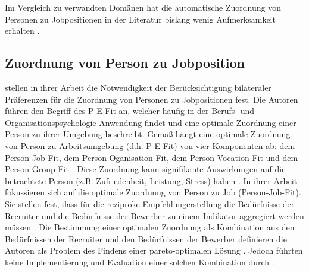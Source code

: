 Im Vergleich zu verwandten Domänen hat die automatische Zuordnung von Personen zu Jobpositionen in der Literatur bislang wenig Aufmerksamkeit erhalten \cite[S. 1469]{yildirim:article}.

\subsection{Zuordnung von Person zu Jobposition}
\label{ch:verwandte_arbeiten:1:2}
\textcite[S. 1ff.]{malinowski:2006} stellen in ihrer Arbeit die Notwendigkeit der Berücksichtigung bilateraler Präferenzen für die Zuordnung von Personen zu Jobpositionen fest.
Die Autoren führen den Begriff des \ac{P-E Fit} an, welcher häufig in der Berufs- und Organisationspsychologie Anwendung findet \cite[S. 2]{link:booklet} und eine optimale Zuordnung einer Person zu ihrer Umgebung beschreibt.
Gemäß \textcite[S. 1ff.]{malinowski:2006} hängt eine optimale Zuordnung von Person zu Arbeitsumgebung (d.h. \ac{P-E Fit}) von vier Komponenten ab: dem Person-Job-Fit, dem Person-Oganisation-Fit, dem Per\-son-Vocation-Fit und dem Person-Group-Fit \cite[S. 3]{malinowski:2006}.
Diese Zuordnung kann signifikante Auswirkungen auf die betrachtete Person (z.B. Zufriedenheit, Leistung, Stress) haben \cite[S. 83]{su:2015}.
In ihrer Arbeit fokussieren sich \textcite[S. 4]{malinowski:2006} auf die optimale Zuordnung von Person zu Job (Person-Job-Fit).
Sie stellen fest, dass für die reziproke Empfehlungerstellung die Bedürfnisse der Recruiter und die Bedürfnisse der Bewerber zu einem Indikator \cite[S. 922]{siting:2012} aggregiert werden müssen \cite[S. 5]{malinowski:2006}.
Die Bestimmung einer optimalen Zuordnung als Kombination aus den Bedürfnissen der Recruiter und den Bedürfnissen der Bewerber definieren die Autoren als Problem des Findens einer pareto-optimalen Lösung \cite[S. 5]{malinowski:2006}.
Jedoch führten \textcite[S. 1ff.]{malinowski:2006} keine Implementierung und Evaluation einer solchen Kombination durch \cite[S. 549]{koprinska:inbook}.

